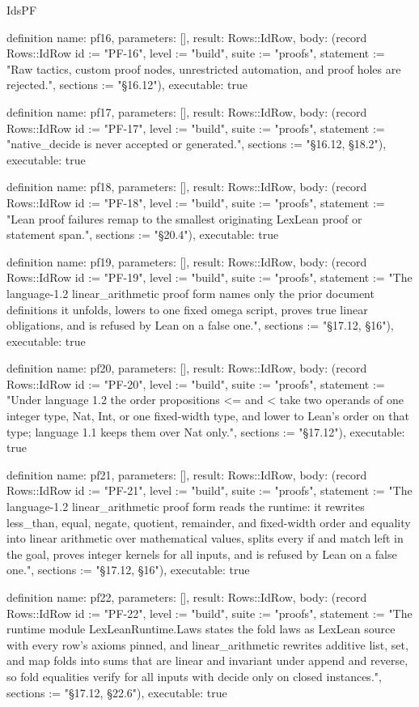 \begin{lexlean}{IdsPF}
\begin{semanticmodule}
definition{
  name: pf16,
  parameters: [],
  result: Rows::IdRow,
  body: (record Rows::IdRow {id := "PF-16", level := "build", suite := "proofs", statement := "Raw tactics, custom proof nodes, unrestricted automation, and proof holes are rejected.", sections := "§16.12"}),
  executable: true
}

definition{
  name: pf17,
  parameters: [],
  result: Rows::IdRow,
  body: (record Rows::IdRow {id := "PF-17", level := "build", suite := "proofs", statement := "native_decide is never accepted or generated.", sections := "§16.12, §18.2"}),
  executable: true
}

definition{
  name: pf18,
  parameters: [],
  result: Rows::IdRow,
  body: (record Rows::IdRow {id := "PF-18", level := "build", suite := "proofs", statement := "Lean proof failures remap to the smallest originating LexLean proof or statement span.", sections := "§20.4"}),
  executable: true
}

definition{
  name: pf19,
  parameters: [],
  result: Rows::IdRow,
  body: (record Rows::IdRow {id := "PF-19", level := "build", suite := "proofs", statement := "The language-1.2 linear_arithmetic proof form names only the prior document definitions it unfolds, lowers to one fixed omega script, proves true linear obligations, and is refused by Lean on a false one.", sections := "§17.12, §16"}),
  executable: true
}

definition{
  name: pf20,
  parameters: [],
  result: Rows::IdRow,
  body: (record Rows::IdRow {id := "PF-20", level := "build", suite := "proofs", statement := "Under language 1.2 the order propositions <= and < take two operands of one integer type, Nat, Int, or one fixed-width type, and lower to Lean's order on that type; language 1.1 keeps them over Nat only.", sections := "§17.12"}),
  executable: true
}

definition{
  name: pf21,
  parameters: [],
  result: Rows::IdRow,
  body: (record Rows::IdRow {id := "PF-21", level := "build", suite := "proofs", statement := "The language-1.2 linear_arithmetic proof form reads the runtime: it rewrites less_than, equal, negate, quotient, remainder, and fixed-width order and equality into linear arithmetic over mathematical values, splits every if and match left in the goal, proves integer kernels for all inputs, and is refused by Lean on a false one.", sections := "§17.12, §16"}),
  executable: true
}

definition{
  name: pf22,
  parameters: [],
  result: Rows::IdRow,
  body: (record Rows::IdRow {id := "PF-22", level := "build", suite := "proofs", statement := "The runtime module LexLeanRuntime.Laws states the fold laws as LexLean source with every row's axioms pinned, and linear_arithmetic rewrites additive list, set, and map folds into sums that are linear and invariant under append and reverse, so fold equalities verify for all inputs with decide only on closed instances.", sections := "§17.12, §22.6"}),
  executable: true
}


\end{semanticmodule}
\end{lexlean}
